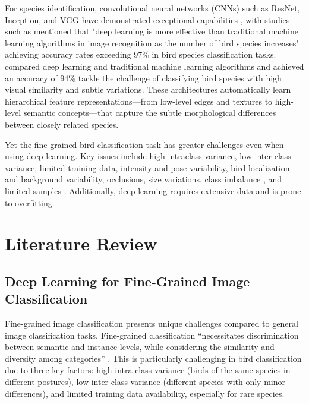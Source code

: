 \documentclass[a4paper,12pt]{report}
\begin{document}
For species identification, convolutional neural networks (CNNs) such as ResNet, Inception, and VGG have demonstrated exceptional capabilities \cite{essay101313}, with studies such as \citep{transferln97} mentioned that "deep learning is more effective than traditional machine learning algorithms in image recognition as the number of bird species increases" achieving accuracy rates exceeding 97\% in bird species classification tasks. \citep{ALFATEMI2024558} compared deep learning and traditional machine learning algorithms and achieved an accuracy of 94\% tackle the challenge of classifying bird species with high visual similarity and subtle variations. These architectures automatically learn hierarchical feature representations—from low-level edges and textures to high-level semantic concepts—that capture the subtle morphological differences between closely related species.

Yet the fine-grained bird classification task has greater challenges even when using deep learning. Key issues include high intraclass variance, low inter-class variance, limited training data, intensity and pose variability, bird localization and background variability, occlusions, size variations, class imbalance \citep{10.1007/978-981-15-1387-9_3}, and limited samples\cite{source3} \citep{ani13020264}. Additionally, deep learning requires extensive data and is prone to overfitting. 


\newpage
\chapter{Literature Review}
\section*{Deep Learning for Fine-Grained Image Classification}
Fine-grained image classification presents unique challenges compared to general image classification tasks. Fine-grained classification \enquote{necessitates discrimination between semantic and instance levels, while considering the similarity and diversity among categories} \citep{source2}. This is particularly challenging in bird classification due to three key factors: high intra-class variance (birds of the same species in different postures), low inter-class variance (different species with only minor differences), and limited training data availability, especially for rare species\citep{source2}.
\end{document}
